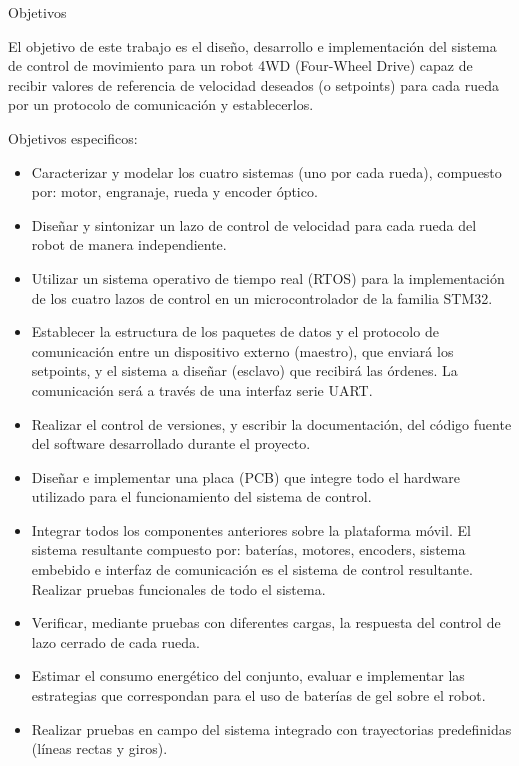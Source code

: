 \begin{titlepage}
    {\LARGE Objetivos}

  
    El objetivo de este trabajo es el diseño, desarrollo e implementación del sistema de control de movimiento para un robot 4WD (Four-Wheel Drive) capaz de recibir valores de referencia de velocidad deseados (o setpoints) para cada rueda por un protocolo de comunicación y establecerlos.
      
    
    Objetivos especificos:
    \begin{itemize}
        \item Caracterizar y modelar los cuatro sistemas (uno por cada rueda), compuesto por: motor, engranaje, rueda y encoder óptico.
        \item Diseñar y sintonizar un lazo de control de velocidad para cada rueda del robot de manera independiente.
        \item Utilizar un sistema operativo de tiempo real (RTOS) para la implementación de los cuatro lazos de control en un microcontrolador de la familia STM32. 
        \item Establecer la estructura de los paquetes de datos y el protocolo de comunicación entre un dispositivo externo (maestro), que enviará los setpoints, y el sistema a diseñar (esclavo) que recibirá las órdenes. La comunicación será a través de una interfaz serie UART.
        \item Realizar el control de versiones, y escribir la documentación, del código fuente del software desarrollado durante el proyecto.
        \item Diseñar e implementar una placa (PCB) que integre todo el hardware utilizado para el funcionamiento del sistema de control.
        \item Integrar todos los componentes anteriores sobre la plataforma móvil. El sistema resultante compuesto por: baterías, motores, encoders, sistema embebido e interfaz de comunicación es el sistema de control resultante. Realizar pruebas funcionales de todo el sistema.
        \item Verificar, mediante pruebas con diferentes cargas, la respuesta del control de lazo cerrado de cada rueda.
        \item Estimar el consumo energético del conjunto, evaluar e implementar las estrategias que correspondan para el uso de baterías de gel sobre el robot.
        \item Realizar pruebas en campo del sistema integrado con trayectorias predefinidas (líneas rectas y giros).

      \end{itemize}
\end{titlepage}

